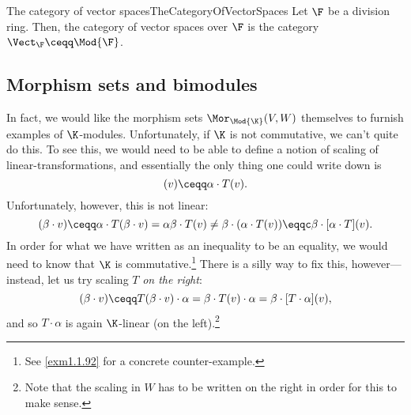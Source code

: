 \begin{exm}{The category of vector spaces}{TheCategoryOfVectorSpaces}
	Let $\F$ be a division ring.  Then, the category of vector spaces over $\F$ is the category $\Vect _{\F}\ceqq \Mod{\F}$\index[notation]{$\Vect _{\F}$}.
\end{exm}

\subsection{Morphism sets and bimodules}\label{sss1.1.2}

In fact, we would like the morphism sets $\Mor _{\Mod{\K}}(V,W)$ themselves to furnish examples of $\K$-modules.  Unfortunately, if $\K$ is not commutative, we can't quite do this.  To see this, we would need to be able to define a notion of scaling of linear-transformations, and essentially the only thing one could write down is
\begin{equation}
	[\alpha \cdot T](v)\ceqq \alpha \cdot T(v).
\end{equation}
Unfortunately, however, this is not linear:
\begin{equation}
	[\alpha \cdot T](\beta \cdot v)\ceqq \alpha \cdot T(\beta \cdot v)=\alpha \beta \cdot T(v)\neq \beta \cdot (\alpha \cdot T(v))\eqqc \beta \cdot [\alpha \cdot T](v).
\end{equation}
In order for what we have written as an inequality to be an equality, we would need to know that $\K$ is commutative.\footnote{See \cref{exm1.1.92} for a concrete counter-example.}  There is a silly way to fix this, however---instead, let us try scaling $T$ \emph{on the right}:
\begin{equation}
	[T\cdot \alpha ](\beta \cdot v)\ceqq T(\beta \cdot v)\cdot \alpha =\beta \cdot T(v)\cdot \alpha =\beta \cdot [T\cdot \alpha ](v),
\end{equation}
and so $T\cdot \alpha$ is again $\K$-linear (on the left).\footnote{Note that the scaling in $W$ has to be written on the right in order for this to make sense.}

